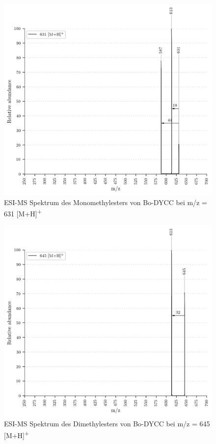 \begin{figure}[!htbp]
  \centering
  \includegraphics[width=\textwidth, height=0.7\textwidth]{figures/Kapitel7/Kataboliten/VWA_MS_631.png}
  \caption[ESI-MS Spektrum des Monomethylesters von Bo-DYCC, Quelle: Author]{ESI-MS Spektrum des Monomethylesters von Bo-DYCC bei m/z = 631 [M+H]\textsuperscript{+}}
  \label{fig:631MH}
\end{figure}

\begin{figure}[!htbp]
  \centering
  \includegraphics[width=\textwidth, height=0.6\textwidth]{figures/Kapitel7/Kataboliten/VWA_MS_645-2.png}
  \caption[ESI-MS Spektrum des Diethylesters von Bo-DYCC, Quelle: Author]{ESI-MS Spektrum des Dimethylesters von Bo-DYCC bei m/z = 645 [M+H]\textsuperscript{+}}
  \label{fig:645MH}
\end{figure}


